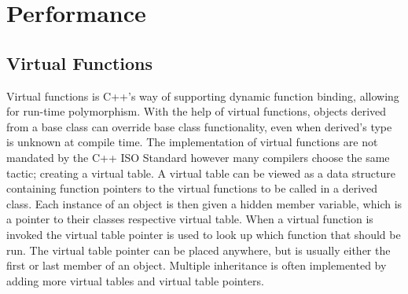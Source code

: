 \section{Performance}

\subsection{Virtual Functions}
Virtual functions is C++'s way of supporting dynamic function binding,
allowing for run-time polymorphism.
With the help of virtual functions, objects derived from a base class
can override base class functionality, even when derived's type is unknown at compile time.
The implementation of virtual functions are not mandated by the C++ ISO Standard 
however many compilers choose the same tactic; creating a virtual table.
A virtual table can be viewed as a data structure containing function pointers to the virtual functions to be called in a derived class.
Each instance of an object is then given a hidden member variable, which is a pointer to their classes respective virtual table.
When a virtual function is invoked the virtual table pointer is used to look up which function that should be run.
The virtual table pointer can be placed anywhere, but is usually either the first or last member of an object.
Multiple inheritance is often implemented by adding more virtual tables and virtual table pointers.

